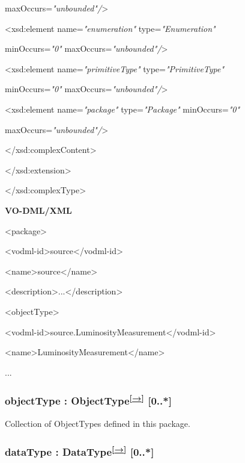 \documentclass[10pt,a4paper]{ivoa}
\begin{document}
maxOccurs=\emph{"unbounded"/}\textgreater{}

\textless xsd:element name=\emph{"enumeration"}
type=\emph{"Enumeration"}

minOccurs=\emph{"0"} maxOccurs=\emph{"unbounded"/}\textgreater{}

\textless xsd:element name=\emph{"primitiveType"}
type=\emph{"PrimitiveType"}

minOccurs=\emph{"0"} maxOccurs=\emph{"unbounded"/}\textgreater{}

\textless xsd:element name=\emph{"package"} type=\emph{"Package"}
minOccurs=\emph{"0"}

maxOccurs=\emph{"unbounded"/}\textgreater{}

\textless/xsd:complexContent\textgreater{}

\textless/xsd:extension\textgreater{}

\textless/xsd:complexType\textgreater{}

\textbf{VO-DML/XML}

\textless package\textgreater{}

\textless vodml-id\textgreater source\textless/vodml-id\textgreater{}

\textless name\textgreater source\textless/name\textgreater{}

\textless description\textgreater...\textless/description\textgreater{}

\textless objectType\textgreater{}

\textless vodml-id\textgreater source.LuminosityMeasurement\textless/vodml-id\textgreater{}

\textless name\textgreater LuminosityMeasurement\textless/name\textgreater{}

...

\hypertarget{objecttype-objecttype-0..}{%
\subsubsection{\texorpdfstring{objectType :
ObjectType\textsuperscript{{[}\protect\hyperlink{objecttype-extends-type}{→}{]}}
{[}0..*{]}}{objectType : ObjectType{[}→{]} {[}0..*{]}}}\label{objecttype-objecttype-0..}}

Collection of ObjectTypes defined in this package.

\hypertarget{datatype-datatype-0..}{%
\subsubsection{\texorpdfstring{dataType :
DataType\textsuperscript{{[}\protect\hyperlink{datatype-extends-valuetype}{→}{]}}
{[}0..*{]}}{dataType : DataType{[}→{]} {[}0..*{]}}}\label{datatype-datatype-0..}}
\end{document}
